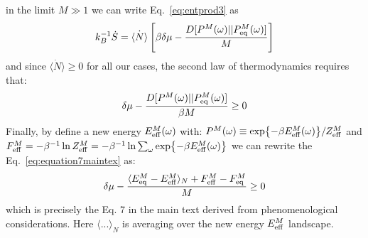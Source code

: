 \documentclass[amsmath,preprintnumbers,10pt,nofootinbib,prl,twocolumn]{revtex4-1}
\begin{document}
in the limit $M\gg 1$
we can write Eq.~\ref{eq:entprod3} as 
\begin{equation}
\label{eq:entprod4}
    k_B^{-1}\dot{S}=\dot{\langle N\rangle}\left[\beta\delta \mu -\frac{D[P^{M}(\omega)|| P_{\rm eq}^{M}(\omega)]}{M}\right]
\end{equation}
and since $\dot{\langle N\rangle}\geq 0$ for all our cases, the second law of thermodynamics requires that:
\begin{equation}
\label{eq:equation7maintex}
    \delta \mu -\frac{D[P^{M}(\omega)|| P_{\rm eq}^{M}(\omega)]}{\beta M}\geq 0
\end{equation}
Finally, by define a new energy $E_{\rm{eff}}^M(\omega)$ with: $P^M(\omega)\equiv\exp{-\beta E_{\rm{eff}}^M(\omega)}/Z^M_{\rm{eff}}$ and $F^M_{\rm{eff}}=-\beta^{-1} \ln Z^M_{\rm{eff}} = -\beta^{-1}\ln \sum_\omega \exp{-\beta E_{\rm{eff}}^M(\omega)}$ we can rewrite the Eq.~\ref{eq:equation7maintex} as:
\begin{equation}
\label{eq:equation7maintex2}
    \delta \mu -\frac{\langle E^M_{\rm{eq}}-E^M_{\rm{eff}}\rangle_N+F^M_{\rm{eff}}-F^M_{\rm{eq}}}{M}\geq 0
\end{equation}
which is precisely the Eq. 7 in the main text derived from phenomenological considerations. Here $\langle... \rangle_N$ is averaging over the new energy $E_{\rm{eff}}^M$ landscape.
\end{document}
